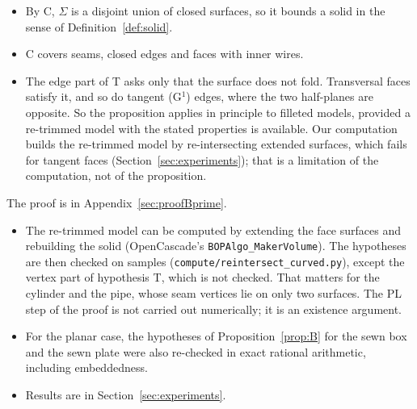 \begin{remark}
\begin{itemize}
\item By C, $\Sigma$ is a disjoint union of closed surfaces, so it bounds a solid in the sense of
Definition~\ref{def:solid}.
\item C covers seams, closed edges and faces with inner wires.
\item The edge part of T asks only that the surface does not fold. Transversal faces satisfy it, and so do tangent (G$^1$)
edges, where the two half-planes are opposite. So the proposition applies in principle to filleted models, provided a
re-trimmed model with the stated properties is available. Our computation builds the re-trimmed model by
re-intersecting extended surfaces, which fails for tangent faces (Section~\ref{sec:experiments}); that is a limitation
of the computation, not of the proposition.
\end{itemize}
\end{remark}
The proof is in Appendix~\ref{sec:proofBprime}.

\begin{remark}
\begin{itemize}
\item The re-trimmed model can be computed by extending the face surfaces and rebuilding the solid
(OpenCascade's \texttt{BOPAlgo\_MakerVolume}). The hypotheses are then checked on samples
(\texttt{compute/reintersect\_curved.py}), except the vertex part of hypothesis T, which is not
checked. That matters for the cylinder and the pipe, whose seam vertices lie on only two surfaces. The PL step of the
proof is not carried out numerically; it is an existence argument.
\item For the planar case, the hypotheses of Proposition~\ref{prop:B} for the sewn box and the sewn plate were also
re-checked in exact rational arithmetic, including embeddedness.
\item Results are in Section~\ref{sec:experiments}.
\end{itemize}
\end{remark}
